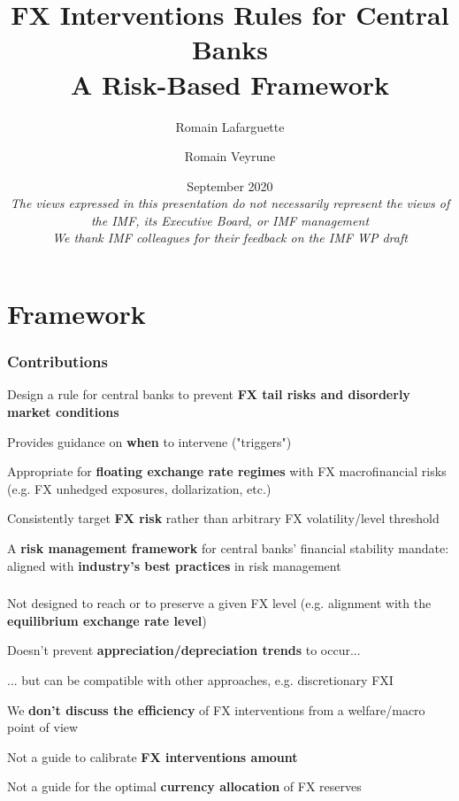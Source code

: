 \documentclass{beamer}
\title[]{FX Interventions Rules for Central Banks\\
A Risk-Based Framework}
\author[]{Romain Lafarguette \and Romain Veyrune}
\institute[]{IMF Monetary and Capital Markets Department \\ Central Bank Operations Division}
\date[]{\scriptsize September 2020 \\ \vspace{0.5cm} \scriptsize{\textit{The views
      expressed in this presentation do not necessarily represent the views of
      the IMF, its Executive Board, or IMF management\\  \vspace{0.2cm} We thank IMF
      colleagues for their feedback on the IMF WP draft}} \vspace{-0.7cm}}
\newenvironment{largeitemize}{\itemize\addtolength{\itemsep}{10pt}}{\enditemize}
\begin{document}
\begingroup
\renewcommand{\insertframenumber}{}
\begin{frame}
\maketitle
\end{frame}
\endgroup


\section{Framework}

\begin{frame}
  \frametitle{Contributions}
  \begin{largeitemize}
    \item Design a rule for central banks to prevent \textbf{FX tail risks and disorderly
        market conditions}
    \item Provides guidance on \textbf{when} to intervene ("triggers")
    \item Appropriate for \textbf{floating exchange rate regimes} with FX
      macrofinancial risks (e.g. FX unhedged exposures,
      dollarization, etc.)
    \item Consistently target \textbf{FX risk} rather than arbitrary FX volatility/level threshold
    \item A \textbf{risk management framework} for central banks' financial
      stability mandate: aligned with \textbf{industry's best practices} in risk management
  \end{largeitemize}  
\end{frame}

\begin{frame}
  \frametitle{\color{red}{What the rule is NOT about}}
  \begin{alertblock}{}
    \begin{largeitemize}
    \item Not designed to reach or to preserve a given FX level
      (e.g. alignment with the \textbf{equilibrium exchange rate level})
    \item Doesn't prevent \textbf{appreciation/depreciation trends} to occur...
    \item ... but can be compatible with other approaches, e.g. discretionary FXI
    \item We \textbf{don't discuss the efficiency} of FX interventions from a
      welfare/macro point of view
    \item Not a guide to calibrate \textbf{FX interventions amount}
    \item Not a guide for the optimal \textbf{currency allocation} of FX reserves
    \end{largeitemize}    
  \end{alertblock}  
\end{frame}
\end{document}
